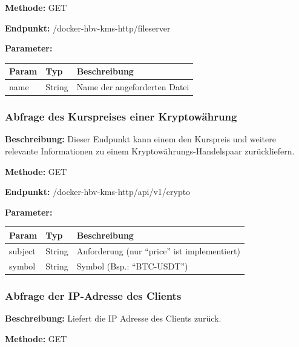 \textbf{Methode:} GET

\textbf{Endpunkt:} /docker-hbv-kms-http/fileserver

\textbf{Parameter:}
\begin{table}[H]
    \label{table:/docker-hbv-kms-http/fileserver}
    \setlength{\tabcolsep}{3pt}
    \begin{tabular}{p{100pt}p{80pt}p{200pt}}
        \toprule
        Param & Typ    & Beschreibung                 \\
        \midrule
        name  & String & Name der angeforderten Datei \\
        \bottomrule
    \end{tabular}
\end{table}
\dotfill


\subsubsection{Abfrage des Kurspreises einer Kryptowährung}
\label{sec:api-crypto}
\textbf{Beschreibung:} Dieser Endpunkt kann einem den Kurspreis und weitere relevante Informationen zu einem Kryptowährungs-Handelspaar zurückliefern.

\textbf{Methode:} GET

\textbf{Endpunkt:} /docker-hbv-kms-http/api/v1/crypto

\textbf{Parameter:}
\begin{table}[H]
    \label{table:/docker-hbv-kms-http/api/v1/crypto}
    \setlength{\tabcolsep}{3pt}
    \begin{tabular}{p{100pt}p{80pt}p{200pt}}
        \toprule
        Param   & Typ    & Beschreibung                                  \\
        \midrule
        subject & String & Anforderung (nur ``price'' ist implementiert) \\
        symbol  & String & Symbol (Bsp.: ``BTC-USDT'')                   \\
        \bottomrule
    \end{tabular}
\end{table}
\dotfill

\subsubsection{Abfrage der IP-Adresse des Clients}
\label{sec:api-client-ip}
\textbf{Beschreibung:} Liefert die IP Adresse des Clients zurück.

\textbf{Methode:} GET

